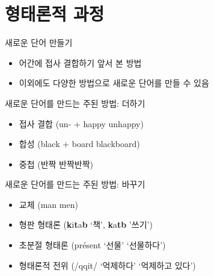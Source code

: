 \documentclass[11pt, aspectratio=169]{beamer}
\newcommand{\texttnr}[1]{{\tnrfont #1}}
\newcommand{\textds}[1]{{\ipafont #1}}
\begin{document}
\section{형태론적 과정}

\begin{frame}[t]{새로운 단어 만들기}
  \begin{itemize}
    \item 어간에 접사 결합하기 \leftarrow 앞서 본 방법
    \item 이외에도 다양한 방법으로 새로운 단어를 만들 수 있음 
  \end{itemize}

  \begin{block}{새로운 단어를 만드는 주된 방법: 더하기}
  \begin{itemize}
    \item 접사 결합 (un- + happy \rightarrow unhappy)
    \item 합성 (black + board \rightarrow blackboard)
    \item 중첩 (반짝 \rightarrow 반짝반짝)
  \end{itemize}
  \end{block}
  \begin{block}{새로운 단어를 만드는 주된 방법: 바꾸기}
    \begin{itemize}
      \item 교체 (man \rightarrow men)
      \item 형판 형태론 (\textbf{k}i\textbf{t}a\textbf{b} ‘책’, \textbf{k}a\textbf{tb} ’쓰기’)
      \item 초분절 형태론 (\texttnr{présent} ‘선물’ \rightarrow \texttnr{presént} ‘선물하다’)
      \item 형태론적 전위 (\textds{/qqit/} ‘억제하다’ \rightarrow \textds{[qiqt]} ‘억제하고 있다’)
    \end{itemize}
  \end{block}

\end{frame}
\end{document}

